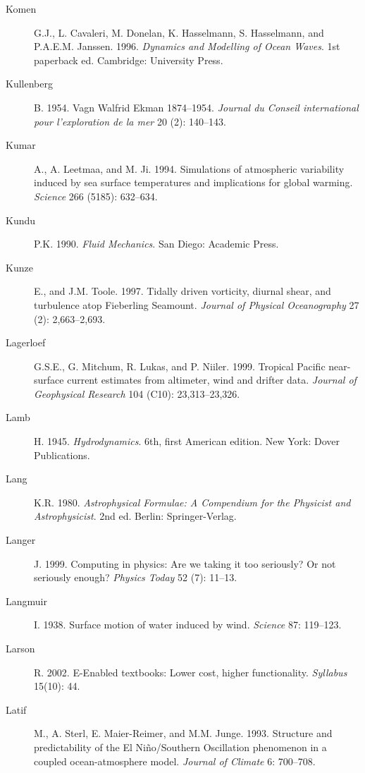 \begin{description}
\item [Komen]G.J., L. Cavaleri, M. Donelan, K. Hasselmann,
  S. Hasselmann, and P.A.E.M. Jans\-sen. 1996. \textit{Dynamics and
    Modelling of Ocean Waves}. 1st paperback ed.  Cambridge:
  University Press.

\item [Kullenberg]B. 1954. Vagn Walfrid Ekman
  1874--1954. \textit{Journal du Conseil international pour
    l'exploration de la mer} 20 (2): 140--143.

\item [Kumar]A., A. Leetmaa, and M. Ji. 1994. Simulations of
  atmospheric variability induced by sea surface temperatures and
  implications for global warming. \textit{Science} 266 (5185):
  632--634.

\item [Kundu]P.K. 1990. \textit{Fluid Mechanics}. San Diego: Academic
  Press.

\item [Kunze]E., and J.M. Toole. 1997. Tidally driven vorticity,
  diurnal shear, and turbulence atop Fieberling
  Seamount. \textit{Journal of Physical Oceanography} 27 (2):
  2,663--2,693.

\item [Lagerloef]G.S.E., G. Mitchum, R. Lukas, and
  P. Niiler. 1999. Tropical Pacific near-surface current estimates
  from altimeter, wind and drifter data.  \textit{Journal of
    Geophysical Research} 104 (C10): 23,313--23,326.

\item [Lamb]H. 1945. \textit{Hydrodynamics}. 6th, first American
  edition. New York: Dover Publications.

\item [Lang]K.R. 1980. \textit{Astrophysical Formulae: A Compendium
  for the Physicist and Astrophysicist}. 2nd ed.  Berlin:
  Springer-Verlag.

\item [Langer]J. 1999. Computing in physics: Are we taking it too
  seriously? Or not seriously enough? \textit{Physics Today} 52 (7):
  11--13.

\item [Langmuir]I. 1938. Surface motion of water induced by
  wind. \textit{Science} 87: 119--123.

\item [Larson]R. 2002. E-Enabled textbooks: Lower cost, higher
  functionality. \textit{Syllabus} 15(10): 44.

\item [Latif]M., A. Sterl, E. Maier-Reimer, and M.M. Junge.
  1993. Structure and predictability of the El Ni\~{n}o/Southern
  Oscillation phenomenon in a coupled ocean-atmosphere
  model. \textit{Journal of Climate} 6: 700--708.


\end{description}
